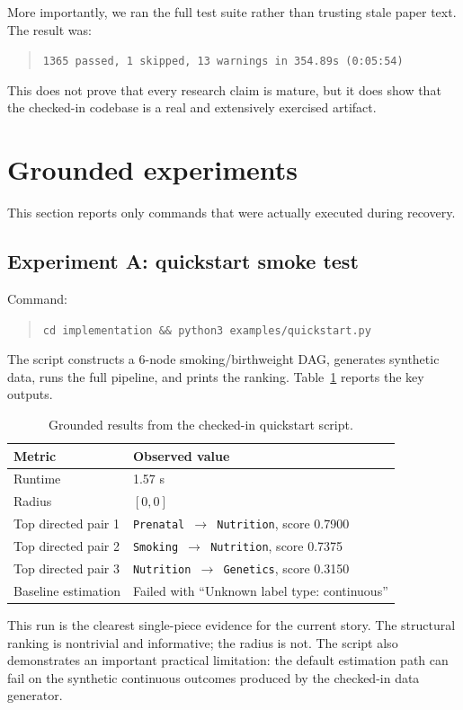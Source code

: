 \documentclass[11pt]{article}
\begin{document}
More importantly, we ran the full test suite rather than trusting stale paper text. The result was:
\begin{quote}
\texttt{1365 passed, 1 skipped, 13 warnings in 354.89s (0:05:54)}
\end{quote}
This does not prove that every research claim is mature, but it does show that the checked-in codebase is a real and extensively exercised artifact.

\section{Grounded experiments}

This section reports only commands that were actually executed during recovery.

\subsection{Experiment A: quickstart smoke test}

Command:
\begin{quote}
\texttt{cd implementation \&\& python3 examples/quickstart.py}
\end{quote}

The script constructs a 6-node smoking/birthweight DAG, generates synthetic data, runs the full pipeline, and prints the ranking. Table~\ref{tab:quickstart} reports the key outputs.

\begin{table}[h]
\centering
\caption{Grounded results from the checked-in quickstart script.}
\label{tab:quickstart}
\begin{tabular}{@{}ll@{}}
\toprule
Metric & Observed value \\
\midrule
Runtime & 1.57 s \\
Radius & $[0,0]$ \\
Top directed pair 1 & \texttt{Prenatal $\to$ Nutrition}, score 0.7900 \\
Top directed pair 2 & \texttt{Smoking $\to$ Nutrition}, score 0.7375 \\
Top directed pair 3 & \texttt{Nutrition $\to$ Genetics}, score 0.3150 \\
Baseline estimation & Failed with ``Unknown label type: continuous'' \\
\bottomrule
\end{tabular}
\end{table}

This run is the clearest single-piece evidence for the current story. The structural ranking is nontrivial and informative; the radius is not. The script also demonstrates an important practical limitation: the default estimation path can fail on the synthetic continuous outcomes produced by the checked-in data generator.
\end{document}
